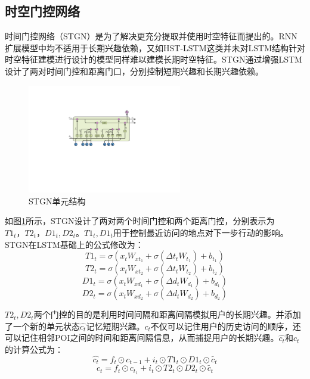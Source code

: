 \documentclass[master]{thesis-uestc}
\begin{document}
\subsection{时空门控网络}
时间门控网络（STGN）是为了解决更充分提取并使用时空特征而提出的。RNN扩展模型中均不适用于长期兴趣依赖，又如HST-LSTM这类并未对LSTM结构针对时空特征建模进行设计的模型同样难以建模长期时空特征。STGN通过增强LSTM设计了两对时间门控和距离门口，分别控制短期兴趣和长期兴趣依赖。

\begin{figure}[!ht]
\centering 
\includegraphics[width=0.6\textwidth]{./pic/stgn.pdf}
\caption{STGN单元结构}
\label{Figure.2.11}
\end{figure}
如图\ref{Figure.2.11}所示，STGN设计了两对两个时间门控和两个距离门控，分别表示为$T1_t，T2_t，D1_t,D2_t$。$T1_t,D1_t$用于控制最近访问的地点对下一步行动的影响。STGN在LSTM基础上的公式修改为：
\begin{equation}
   T1_t=\sigma(x_tW_{xt_1}+\sigma(\Delta t_tW_{t_1})+b_{t_1})
\end{equation}
\begin{equation}
   T2_t=\sigma(x_tW_{xt_2}+\sigma(\Delta t_tW_{t_2})+b_{t_2})
\end{equation}
\begin{equation}
   D1_t=\sigma(x_tW_{xd_1}+\sigma(\Delta d_tW_{d_1})+b_{d_1})
\end{equation}
\begin{equation}
   D2_t=\sigma(x_tW_{xd_2}+\sigma(\Delta d_tW_{d_2})+b_{d_2})
\end{equation}

$T2_t,D2_t$两个门控的目的是利用时间间隔和距离间隔模拟用户的长期兴趣。并添加了一个新的单元状态$\hat{c_t}$记忆短期兴趣。$c_t$不仅可以记住用户的历史访问的顺序，还可以记住相邻POI之间的时间和距离间隔信息，从而捕捉用户的长期兴趣。$\hat{c_t}$和$c_t$的计算公式为：
\begin{equation}
   \hat{c_t}=f_t\odot c_{t-1}+i_t \odot T1_t \odot D1_t \odot \tilde{c_t}
\end{equation}
\begin{equation}
   c_t=f_t \odot c_{t_1}+i_t \odot T2_t \odot D2_t \odot \tilde{c_t}
\end{equation}
\end{document}
